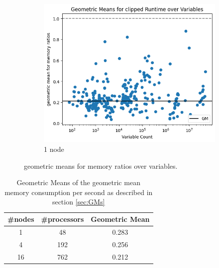 \documentclass[12pt,a4paper,twoside]{scrartcl}
\numberwithin{equation}{section}
\begin{document}
\begin{figure}
\begin{subfigure}[c]{.4\textwidth}
    \center
    \includegraphics[scale=.3]{plots/16node_compare/mem_gm_over_vars.png}
    \caption{1 node}
  \end{subfigure}
  \caption{geometric means for memory ratios over variables.}
  \label{fig:memGmVars}
\end{figure}

\begin{table}
  \center
  \begin{tabular}{ c|c|c }
    \#nodes & \#processors & Geometric Mean \\
    \hline
    1  & 48  & 0.283\\
    \hline
    4  & 192 & 0.256\\
    \hline
    16 & 762 & 0.212
  \end{tabular}
  \caption{Geometric Means of the geometric mean memory consumption per second as described in section \ref{sec:GMs}}
  \label{tab:memGM}
\end{table}
\end{document}

